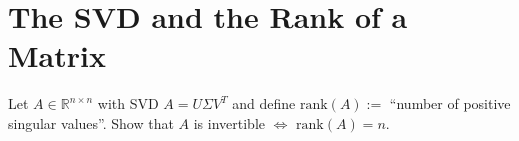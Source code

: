 \section{The SVD and the Rank of a Matrix}
Let $A \in \mathbb{R}^{n\times n}$ with SVD $A= U\Sigma V^T$ and define $\text{rank}(A) :=$ ``number of positive singular values''. Show that $A$ is invertible $\iff$ $\text{rank}(A) = n$.
 
